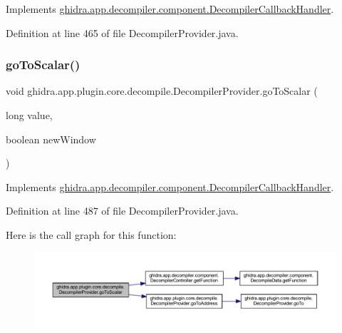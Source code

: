 Implements \mbox{\hyperlink{interfaceghidra_1_1app_1_1decompiler_1_1component_1_1_decompiler_callback_handler_ac730fdb08d3f3ac4454d34b42cfe3d2b}{ghidra.\+app.\+decompiler.\+component.\+Decompiler\+Callback\+Handler}}.



Definition at line 465 of file Decompiler\+Provider.\+java.

\mbox{\label{classghidra_1_1app_1_1plugin_1_1core_1_1decompile_1_1_decompiler_provider_aa4da717a0d4ecf7e1ac7b54ade004903}} 
\subsubsection{\texorpdfstring{goToScalar()}{goToScalar()}}
{\footnotesize\ttfamily void ghidra.\+app.\+plugin.\+core.\+decompile.\+Decompiler\+Provider.\+go\+To\+Scalar (\begin{DoxyParamCaption}\item[{long}]{value,  }\item[{boolean}]{new\+Window }\end{DoxyParamCaption})\hspace{0.3cm}{\ttfamily [inline]}}



Implements \mbox{\hyperlink{interfaceghidra_1_1app_1_1decompiler_1_1component_1_1_decompiler_callback_handler_a32303b61cd68fd57ce7e33a2973f9372}{ghidra.\+app.\+decompiler.\+component.\+Decompiler\+Callback\+Handler}}.



Definition at line 487 of file Decompiler\+Provider.\+java.

Here is the call graph for this function\+:
\nopagebreak
\begin{figure}[H]
\begin{center}
\leavevmode
\includegraphics[width=350pt]{classghidra_1_1app_1_1plugin_1_1core_1_1decompile_1_1_decompiler_provider_aa4da717a0d4ecf7e1ac7b54ade004903_cgraph}
\end{center}
\end{figure}
\mbox{\label{classghidra_1_1app_1_1plugin_1_1core_1_1decompile_1_1_decompiler_provider_afbefb9a625e7ff455be0aa5352f52347}} 
